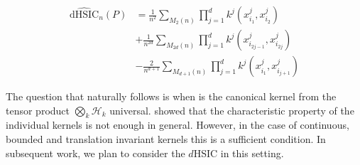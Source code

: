 \begin{equation} \label{hsicdhsic_samp}
\begin{split}
\hat{\text{dHSIC}}_n(P) &= \frac{1}{n^2}\sum_{M_2(n)}\prod_{j=1}^d k^j(x_{i_1}^j, x_{i_2}^j) \\
&+ \frac{1}{n^{2d}}\sum_{M_{2d}(n)}\prod_{j=1}^d k^j(x_{i_{2j-1}}^j, x_{i_{2j}}^j) \\
&- \frac{2}{n^{d+1}}\sum_{M_{d+1}(n)}\prod_{j=1}^d k^j(x_{i_{1}}^j, x_{i_{j+1}}^j)
\end{split}
\end{equation}

The question that naturally follows is when is the canonical kernel from the tensor product $\bigotimes_k\mathcal{H}_k$ universal. \cite{Szabo2017} showed that the characteristic property of the individual kernels is not enough in general. However, in the case of  continuous,
bounded and translation invariant kernels this is a sufficient condition. In subsequent work, we plan to consider the $d$HSIC in this setting.
